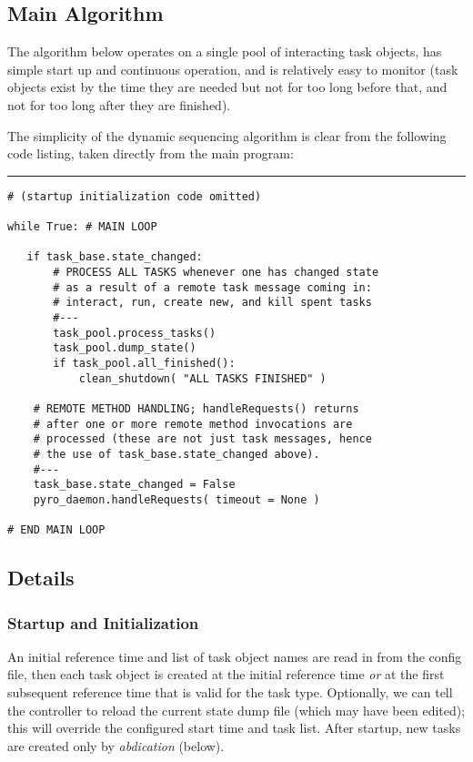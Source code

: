 \documentclass[11pt,a4paper]{article}
\begin{document}
\subsection{Main Algorithm}

The algorithm below operates on a single pool of interacting task
objects, has simple start up and continuous operation, and is relatively
easy to monitor (task objects exist by the time they are needed but not
for too long before that, and not for too long after they are finished). 

The simplicity of the dynamic sequencing algorithm is clear from the
following code listing, taken directly from the main program:

{\small
\noindent
\rule{5cm}{.2mm}
\begin{lstlisting}
# (startup initialization code omitted)

while True: # MAIN LOOP

   if task_base.state_changed:
       # PROCESS ALL TASKS whenever one has changed state
       # as a result of a remote task message coming in: 
       # interact, run, create new, and kill spent tasks
       #---
       task_pool.process_tasks()
       task_pool.dump_state()
       if task_pool.all_finished():
           clean_shutdown( "ALL TASKS FINISHED" )

    # REMOTE METHOD HANDLING; handleRequests() returns 
    # after one or more remote method invocations are 
    # processed (these are not just task messages, hence 
    # the use of task_base.state_changed above).
    #---
    task_base.state_changed = False
    pyro_daemon.handleRequests( timeout = None )

# END MAIN LOOP
\end{lstlisting}
}

\subsection{Details}

\subsubsection{Startup and Initialization}

An initial reference time and list of task object names are read in from
the config file, then each task object is created at the initial
reference time {\em or} at the first subsequent reference time that is
valid for the task type. Optionally, we can tell the controller to
reload the current state dump file (which may have been edited); this
will override the configured start time and task list. After startup,
new tasks are created only by {\em abdication} (below).
\end{document}
